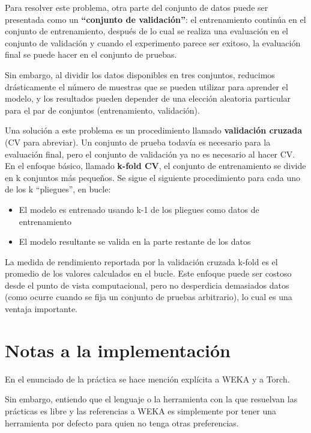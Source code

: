\documentclass[11pt]{article}
\providecommand{\tightlist}{%
      \setlength{\itemsep}{0pt}\setlength{\parskip}{0pt}}
\begin{document}
Para resolver este problema, otra parte del conjunto de datos puede ser
presentada como un \textbf{``conjunto de validación''}: el entrenamiento
continúa en el conjunto de entrenamiento, después de lo cual se realiza
una evaluación en el conjunto de validación y cuando el experimento
parece ser exitoso, la evaluación final se puede hacer en el conjunto de
pruebas.

Sin embargo, al dividir los datos disponibles en tres conjuntos,
reducimos drásticamente el número de muestras que se pueden utilizar
para aprender el modelo, y los resultados pueden depender de una
elección aleatoria particular para el par de conjuntos (entrenamiento,
validación).

Una solución a este problema es un procedimiento llamado
\textbf{validación cruzada} (CV para abreviar). Un conjunto de prueba
todavía es necesario para la evaluación final, pero el conjunto de
validación ya no es necesario al hacer CV. En el enfoque básico, llamado
\textbf{k-fold CV}, el conjunto de entrenamiento se divide en k
conjuntos más pequeños. Se sigue el siguiente procedimiento para cada
uno de los k ``pliegues'', en bucle:

\begin{itemize}
\tightlist
\item
  El modelo es entrenado usando k-1 de los pliegues como datos de
  entrenamiento
\item
  El modelo resultante se valida en la parte restante de los datos
\end{itemize}

La medida de rendimiento reportada por la validación cruzada k-fold es
el promedio de los valores calculados en el bucle. Este enfoque puede
ser costoso desde el punto de vista computacional, pero no desperdicia
demasiados datos (como ocurre cuando se fija un conjunto de pruebas
arbitrario), lo cual es una ventaja importante.

\section{Notas a la implementación}\label{notas-a-la-implementaciuxf3n}

En el enunciado de la práctica se hace mención explícita a WEKA y a
Torch.

Sin embargo, entiendo que el lenguaje o la herramienta con la que
resuelvan las prácticas es libre y las referencias a WEKA es simplemente
por tener una herramienta por defecto para quien no tenga otras
preferencias.
\end{document}
